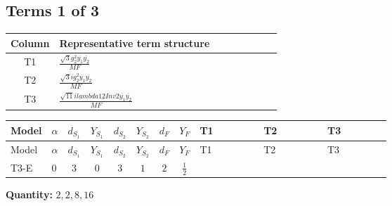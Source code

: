 \documentclass[8pt]{article}
\begin{document}
\begin{landscape}
\subsection*{Terms 1 of 3}
\begin{center}
\begin{tabular}{@{}c >{\raggedright\arraybackslash}p{0.82\linewidth}@{}}
\toprule
Column & Representative term structure \\
\midrule
T1 & \(\displaystyle \frac{\sqrt{3} g_{2}^{2} \overline{y_{1}} \overline{y_{2}}}{MF}\) \\
\midrule
T2 & \(\displaystyle \frac{\sqrt{3} i g_{2}^{2} \overline{y_{1}} \overline{y_{2}}}{MF}\) \\
\midrule
T3 & \(\displaystyle \frac{\sqrt{11} i lambda12Inv2 \overline{y_{1}} \overline{y_{2}}}{MF}\) \\
\midrule
\bottomrule
\end{tabular}
\end{center}
\smallskip
\tiny
\begin{longtable}{@{}llcccccc >{\raggedright\arraybackslash}p{0.21\linewidth} >{\raggedright\arraybackslash}p{0.21\linewidth} >{\raggedright\arraybackslash}p{0.21\linewidth}@{}}
\toprule
Model & $\alpha$ & $d_{S_1}$ & $Y_{S_1}$ & $d_{S_2}$ & $Y_{S_2}$ & $d_F$ & $Y_F$ & T1 & T2 & T3 \\
\midrule
\endfirsthead
\toprule
Model & $\alpha$ & $d_{S_1}$ & $Y_{S_1}$ & $d_{S_2}$ & $Y_{S_2}$ & $d_F$ & $Y_F$ & T1 & T2 & T3 \\
\midrule
\endhead
T3-E & $0$ & $3$ & $0$ & $3$ & $1$ & $2$ & $\frac{1}{2}$ & \scriptsize\adjustbox{max width=\linewidth}{$\begin{gathered} \frac{\sqrt{3} g_{2}^{2} \overline{y_{1}} \overline{y_{2}}}{6 MF}\end{gathered}$} & \scriptsize\adjustbox{max width=\linewidth}{$\begin{gathered} - \frac{49 \sqrt{3} i g_{2}^{2} \overline{y_{1}} \overline{y_{2}}}{24 MF}\end{gathered}$} & \scriptsize\adjustbox{max width=\linewidth}{$\begin{gathered} - \frac{3 \sqrt{11} i lambda12Inv2 \overline{y_{1}} \overline{y_{2}}}{22 MF}\end{gathered}$} \\
\midrule
\bottomrule
\end{longtable}
\clearpage
\noindent\textbf{Quantity: }$\mathrm{2,2,8,16}$\par\smallskip

\end{landscape}
\end{document}
